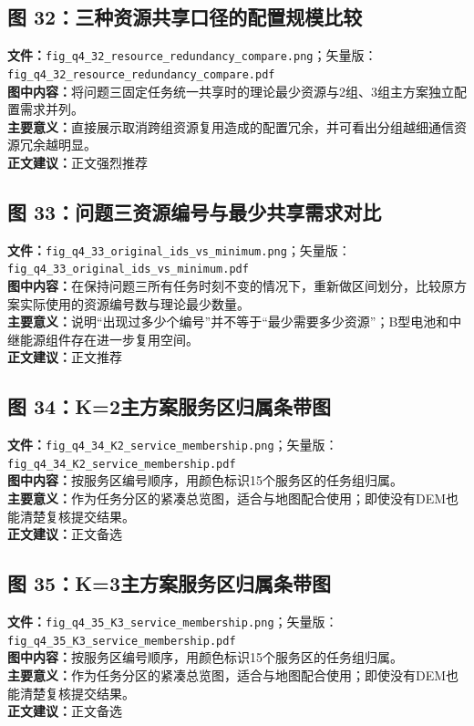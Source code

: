 \subsection*{图 32：三种资源共享口径的配置规模比较}
\textbf{文件：}\texttt{fig\_q4\_32\_resource\_redundancy\_compare.png}；矢量版：\texttt{fig\_q4\_32\_resource\_redundancy\_compare.pdf}\\
\textbf{图中内容：}将问题三固定任务统一共享时的理论最少资源与2组、3组主方案独立配置需求并列。\\
\textbf{主要意义：}直接展示取消跨组资源复用造成的配置冗余，并可看出分组越细通信资源冗余越明显。\\
\textbf{正文建议：}正文强烈推荐

\subsection*{图 33：问题三资源编号与最少共享需求对比}
\textbf{文件：}\texttt{fig\_q4\_33\_original\_ids\_vs\_minimum.png}；矢量版：\texttt{fig\_q4\_33\_original\_ids\_vs\_minimum.pdf}\\
\textbf{图中内容：}在保持问题三所有任务时刻不变的情况下，重新做区间划分，比较原方案实际使用的资源编号数与理论最少数量。\\
\textbf{主要意义：}说明“出现过多少个编号”并不等于“最少需要多少资源”；B型电池和中继能源组件存在进一步复用空间。\\
\textbf{正文建议：}正文推荐

\subsection*{图 34：K=2主方案服务区归属条带图}
\textbf{文件：}\texttt{fig\_q4\_34\_K2\_service\_membership.png}；矢量版：\texttt{fig\_q4\_34\_K2\_service\_membership.pdf}\\
\textbf{图中内容：}按服务区编号顺序，用颜色标识15个服务区的任务组归属。\\
\textbf{主要意义：}作为任务分区的紧凑总览图，适合与地图配合使用；即使没有DEM也能清楚复核提交结果。\\
\textbf{正文建议：}正文备选

\subsection*{图 35：K=3主方案服务区归属条带图}
\textbf{文件：}\texttt{fig\_q4\_35\_K3\_service\_membership.png}；矢量版：\texttt{fig\_q4\_35\_K3\_service\_membership.pdf}\\
\textbf{图中内容：}按服务区编号顺序，用颜色标识15个服务区的任务组归属。\\
\textbf{主要意义：}作为任务分区的紧凑总览图，适合与地图配合使用；即使没有DEM也能清楚复核提交结果。\\
\textbf{正文建议：}正文备选


